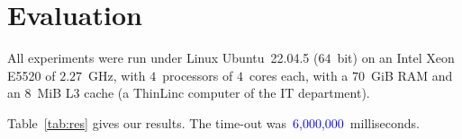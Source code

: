\documentclass[a4paper,11pt,hidelinks]{article}
\renewcommand{\todo}[1]{\textcolor{blue}{#1}} %
\newcommand{\Problem}{\todo{Problem}\xspace}  %
\begin{document}

\section{Evaluation}


All experiments were run under Linux Ubuntu~22.04.5 ($64$~bit) on an
Intel Xeon E5520 of $2.27$~GHz, with $4$~processors of $4$~cores each,
with a $70$~GiB RAM and an $8$~MiB L3 cache (a ThinLinc computer of the
IT department). %

\newcommand{\TimeOut}{\todo{6,000,000}} %


Table~\ref{tab:res} gives our results.
The time-out was~\TimeOut~milliseconds.

\begin{table}[t]
  \centering
  \caption{Results for our approach to \Problem,
    which is a \todo{minimisation / maximisation / satisfaction} problem.
    In each \texttt{time} column: if the reported time is less than
    the time-out (\TimeOut~milliseconds here), then the
    \todo{objective value in the corresponding \texttt{obj} column was
      \emph{proven} optimal};
    else the timing out is indicated by \texttt{t/o} and the
    \todo{objective value is either the best one found but \emph{not}
      proven optimal before timing out,
      or~`\texttt{-}' indicating that no feasible solution was found
      before timing out}.
    Boldface indicates the
    \todo{best performance (time or objective value)}
    on each row.
  }
  \label{tab:res}
\end{table}
\end{document}
